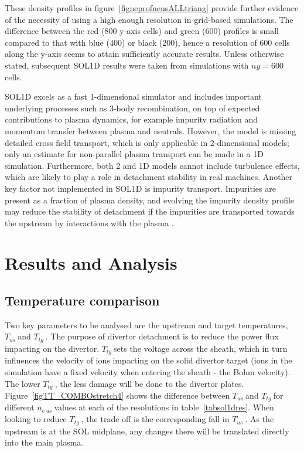 \documentclass[12pt]{article}  %
\providecommand{\neus}{$n_{e~us}~$} %
\providecommand{\Tus}{$T_{us}~$} %
\providecommand{\Ttg}{$T_{tg}~$} %
\begin{document}
These density profiles in figure~\ref{figneprofneusALLtriang} provide further evidence of the necessity of using a high enough resolution in grid-based simulations. The difference between the red (800 y-axis cells) and green (600) profiles is small compared to that with blue (400) or black (200), hence a resolution of 600 cells along the y-axis seems to attain sufficiently accurate results. Unless otherwise stated, subsequent SOL1D results were taken from simulations with $ny = 600$ cells.

SOL1D excels as a fast 1-dimensional simulator and includes important underlying processes such as 3-body recombination, on top of expected contributions to plasma dynamics, for example impurity radiation and momentum transfer between plasma and neutrals. However, the model is missing detailed cross field transport, which is only applicable in 2-dimensional models; only an estimate for non-parallel plasma transport can be made in a 1D simulation. Furthermore, both 2 and 1D models cannot include turbulence effects, which are likely to play a role in detachment stability in real machines. Another key factor not implemented in SOL1D is impurity transport. Impurities are present as a fraction of plasma density, and evolving the impurity density profile may reduce the stability of detachment if the impurities are transported towards the upstream by interactions with the plasma \cite{Nakazawa2000}.



\section{Results and Analysis}\label{secResults}
\subsection{Temperature comparison}\label{ssectempcomp}
Two key parameters to be analysed are the upstream and target temperatures, \Tus and \Ttg. The purpose of divertor detachment is to reduce the power flux impacting on the divertor. \Ttg sets the voltage across the sheath, which in turn influences the velocity of ions impacting on the solid divertor target (ions in the simulation have a fixed velocity when entering the sheath - the Bohm velocity). The lower \Ttg, the less damage will be done to the divertor plates. Figure~\ref{figTT_COMBOstretch4} shows the difference between \Tus and \Ttg for different \neus values at each of the resolutions in table~\ref{tabsol1dres}. When looking to reduce \Ttg, the trade off is the corresponding fall in \Tus. As the upstream is at the SOL midplane, any changes there will be translated directly into the main plasma. 
\end{document}
